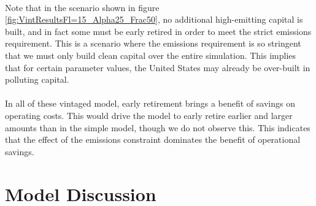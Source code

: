 \documentclass{article}
\begin{document}
\paragraph{} Note that in the scenario shown in figure \ref{fig:VintResultsFl=15_Alpha25_Frac50}, no additional high-emitting capital is built, and in fact some must be early retired in order to meet the strict emissions requirement. This is a scenario where the emissions requirement is so stringent that we must only build clean capital over the entire simulation. This implies that for certain parameter values, the United States may already be over-built in polluting capital. 

\paragraph{} In all of these vintaged model, early retirement brings a benefit of savings on operating costs. This would drive the model to early retire earlier and larger amounts than in the simple model, though we do not observe this. This indicates that the effect of the emissions constraint dominates the benefit of operational savings. 


\FloatBarrier


\section{Model Discussion}
\end{document}
